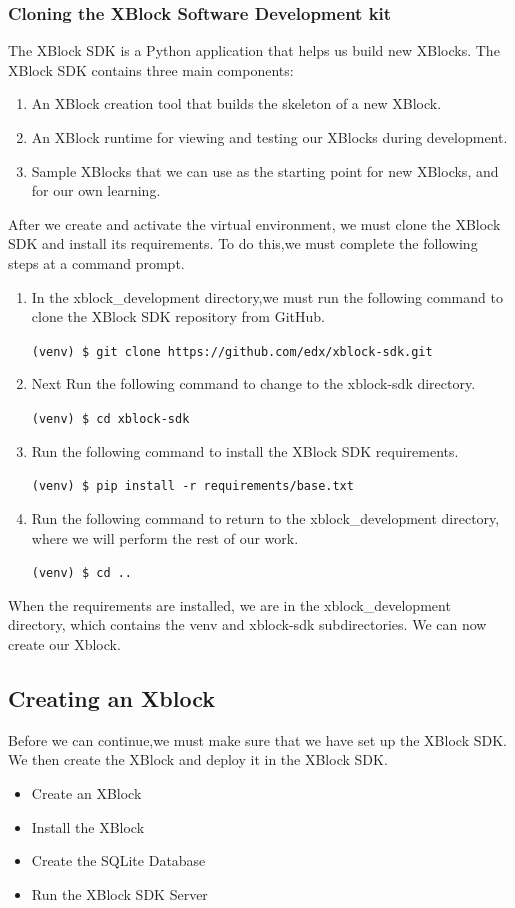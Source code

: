 \subsubsection{Cloning the XBlock Software Development kit}
The XBlock SDK is a Python application that helps us build new XBlocks. The XBlock
SDK contains three main components:
\begin{enumerate}
\item An XBlock creation tool that builds the skeleton of a new XBlock.
\item An XBlock runtime for viewing and testing our XBlocks during development.
\item Sample XBlocks that we can use as the starting point for new XBlocks, and for our
own learning.
\end{enumerate}
After we create and activate the virtual environment, we must clone the XBlock SDK and
install its requirements. To do this,we must complete the following steps at a command prompt.
\begin{enumerate}
\item In the xblock\_development directory,we must run the following command to clone the
XBlock SDK repository from GitHub.
\begin{center}\verb=(venv) $ git clone https://github.com/edx/xblock-sdk.git=\end{center}
\item Next Run the following command to change to the xblock-sdk directory.
\begin{center}\verb=(venv) $ cd xblock-sdk=\end{center}
\item Run the following command to install the XBlock SDK requirements.
\begin{center}\verb=(venv) $ pip install -r requirements/base.txt=\end{center}
\item Run the following command to return to the xblock\_development directory,
where we will perform the rest of our work.
\begin{center}\verb=(venv) $ cd ..=\end{center}
\end{enumerate}
When the requirements are installed, we are in the xblock\_development directory, which
contains the venv and xblock-sdk subdirectories. We can now create our Xblock.


\subsection{Creating an Xblock}
Before we can continue,we must make sure that we have set up the XBlock SDK. We then create the XBlock
and deploy it in the XBlock SDK.
\begin{itemize}
\item Create an XBlock
\item Install the XBlock
\item Create the SQLite Database
\item Run the XBlock SDK Server
\end{itemize}

